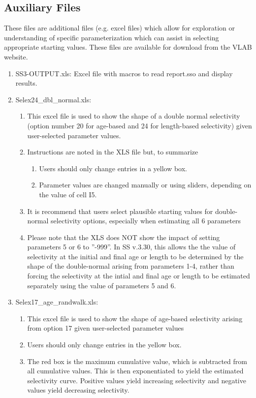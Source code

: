 	\subsection{Auxiliary Files}
	These files are additional files (e.g. excel files) which allow for exploration or understanding of specific parameterization which can assist in selecting appropriate starting values.  These files are available for download from the VLAB website. 
	\begin{enumerate}
		\item SS3-OUTPUT.xls:   Excel file with macros to read report.sso and display results.
		\item Selex24\_dbl\_normal.xls:
		\begin{enumerate}
			\item This excel file is used to show the shape of a double normal selectivity (option number 20 for age-based and 24 for length-based selectivity) given user-selected parameter values.
			\item Instructions are noted in the XLS file but, to summarize
			\begin{enumerate}
				\item Users should only change entries in a yellow box. 
				\item Parameter values are changed manually or using sliders, depending on the value of cell I5.
			\end{enumerate}
			\item It is recommend that users select plausible starting values for double-normal selectivity options, especially when estimating all 6 parameters
			\item Please note that the XLS does NOT show the impact of setting parameters 5 or 6 to ''-999''.  In SS v.3.30, this allows the the value of selectivity at the initial and final age or length to be determined by the shape of the double-normal arising from parameters 1-4, rather than forcing the selectivity at the intial and final age or length to be estimated separately using the value of parameters 5 and 6. 
		\end{enumerate}
		\item Selex17\_age\_randwalk.xls:
		\begin{enumerate}
			\item This excel file is used to show the shape of age-based selectivity arising from option 17 given user-selected parameter values
			\item Users should only change entries in the yellow box.
			\item The red box is the maximum cumulative value, which is subtracted from all cumulative values.  This is then exponentiated to yield the estimated selectivity curve.  Positive values yield increasing selectivity and negative values yield decreasing selectivity.

\end{enumerate}
\end{enumerate}

